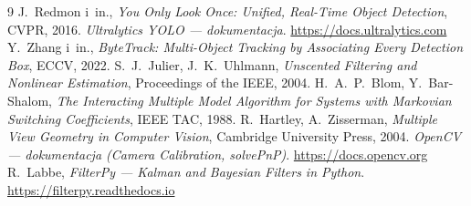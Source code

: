 \documentclass[14pt,a4paper]{extarticle}
\begin{document}
\begin{thebibliography}{9}
 J.~Redmon i~in., \emph{You Only Look Once: Unified, Real-Time Object
  Detection}, CVPR, 2016.
 \emph{Ultralytics YOLO — dokumentacja}. \url{https://docs.ultralytics.com}
 Y.~Zhang i~in., \emph{ByteTrack: Multi-Object Tracking by
  Associating Every Detection Box}, ECCV, 2022.
 S.~J.~Julier, J.~K.~Uhlmann, \emph{Unscented Filtering and Nonlinear
  Estimation}, Proceedings of the IEEE, 2004.
 H.~A.~P.~Blom, Y.~Bar-Shalom, \emph{The Interacting Multiple Model
  Algorithm for Systems with Markovian Switching Coefficients}, IEEE TAC, 1988.
 R.~Hartley, A.~Zisserman, \emph{Multiple View Geometry in Computer
  Vision}, Cambridge University Press, 2004.
 \emph{OpenCV — dokumentacja (Camera Calibration, solvePnP)}.
  \url{https://docs.opencv.org}
 R.~Labbe, \emph{FilterPy — Kalman and Bayesian Filters in Python}.
  \url{https://filterpy.readthedocs.io}
\end{thebibliography}

\newpage
{}
\listoffigures
{}
\listoftables
\end{document}
